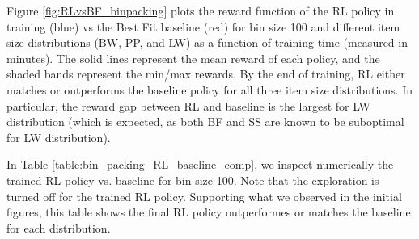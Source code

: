 Figure \ref{fig:RLvsBF_binpacking} plots the reward function of the RL policy in training (blue) vs the Best Fit baseline (red) for bin size 100 and different item size distributions (BW, PP, and LW) as a function of training time (measured in minutes). The solid lines represent the mean reward of each policy, and the shaded bands represent the min/max rewards. By the end of training, RL either matches or outperforms the baseline policy for all three item size distributions. In particular, the reward gap between RL and baseline is the largest for LW distribution (which is expected, as both BF and SS are known to be suboptimal for LW distribution). %


In Table \ref{table:bin_packing_RL_baseline_comp}, we inspect numerically the trained RL policy vs. baseline for bin size 100.  Note that the exploration is turned off for the trained RL policy.  Supporting what we observed in the initial figures, this table shows the final RL policy outperformes or matches the baseline for each distribution.

